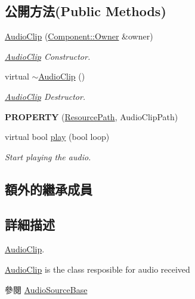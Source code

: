 \subsection*{公開方法(Public Methods)}
\begin{DoxyCompactItemize}
\item 
\hyperlink{class_i_dream_sky_1_1_audio_clip_a7e20cfc43c6a9e0ff5881b283888044b}{Audio\+Clip} (\hyperlink{class_i_dream_sky_1_1_component_1_1_owner}{Component\+::\+Owner} \&owner)
\begin{DoxyCompactList}\small\item\em \hyperlink{class_i_dream_sky_1_1_audio_clip}{Audio\+Clip} Constructor. \end{DoxyCompactList}\item 
virtual \hyperlink{class_i_dream_sky_1_1_audio_clip_ab929796e463c51c50f2ad4e9acec35da}{$\sim$\+Audio\+Clip} ()
\begin{DoxyCompactList}\small\item\em \hyperlink{class_i_dream_sky_1_1_audio_clip}{Audio\+Clip} Destructor. \end{DoxyCompactList}\item 
{\bfseries P\+R\+O\+P\+E\+R\+TY} (\hyperlink{class_i_dream_sky_1_1_resource_path}{Resource\+Path}, Audio\+Clip\+Path)\hypertarget{class_i_dream_sky_1_1_audio_clip_a59ff1cc7d469f3ddfc2f0a5e9f887f70}{}\label{class_i_dream_sky_1_1_audio_clip_a59ff1cc7d469f3ddfc2f0a5e9f887f70}

\item 
virtual bool \hyperlink{class_i_dream_sky_1_1_audio_clip_a321057b7eee920588da25754380af705}{play} (bool loop)
\begin{DoxyCompactList}\small\item\em Start playing the audio. \end{DoxyCompactList}\end{DoxyCompactItemize}
\subsection*{額外的繼承成員}


\subsection{詳細描述}
\hyperlink{class_i_dream_sky_1_1_audio_clip}{Audio\+Clip}. 

\hyperlink{class_i_dream_sky_1_1_audio_clip}{Audio\+Clip} is the class resposible for audio received \begin{DoxySeeAlso}{參閱}
\hyperlink{class_i_dream_sky_1_1_audio_source_base}{Audio\+Source\+Base} 
\end{DoxySeeAlso}


